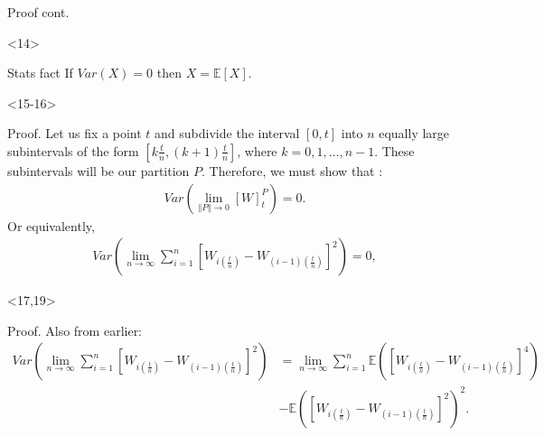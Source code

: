 \documentclass[10pt]{beamer}
\begin{document}
\begin{frame}[t]
\begin{onlyenv}
\begin{block}{Proof cont.}
{      }
      \end{block}
    \end{onlyenv}
    \begin{onlyenv}<14>
      \begin{block}{Stats fact}
        If $Var(X) = 0$ then $X = \mathbb{E}\left[ X \right]$.
      \end{block}
    \end{onlyenv}
    \begin{onlyenv}<15-16>
      \begin{block}{Proof.}
        Let us fix a point $t$ and subdivide the interval $[0,t]$ into $n$ equally large subintervals of the form $[k\frac{t}{n}, (k+1)\frac{t}{n}]$, where $k = 0,1,\ldots,n-1$. These subintervals will be our partition $P$. Therefore, we must show that :
        \begin{align*}
          Var(\lim\limits_{\Vert P \Vert \to 0} \left[ W \right]^{P}_t) = 0.
        \end{align*}
        Or equivalently,
        \begin{align*}
          Var(\lim\limits_{n \to \infty} \displaystyle\sum_{i=1}^{n}\left[W_{i(\frac{t}{n})} - W_{(i-1)(\frac{t}{n})}\right]^2) = 0,
        \end{align*}
      \end{block}
    \end{onlyenv}
    \begin{onlyenv}<17,19>
      \begin{block}{Proof.}
        Also from earlier:
        \begin{align*}
          Var(\lim\limits_{n \to \infty} \displaystyle\sum_{i=1}^{n}\left[W_{i(\frac{t}{n})} - W_{(i-1)(\frac{t}{n})}\right]^2) &= \lim\limits_{n \to \infty} \displaystyle\sum_{i=1}^{n} \mathbb{E}(\left[W_{i(\frac{t}{n})} - W_{(i-1)(\frac{t}{n})}\right]^4) \\
          &- \mathbb{E}\left(\left[W_{i(\frac{t}{n})} - W_{(i-1)(\frac{t}{n})}\right]^2\right)^2.
        \end{align*}
\end{block}
\end{onlyenv}
\end{frame}
\end{document}
